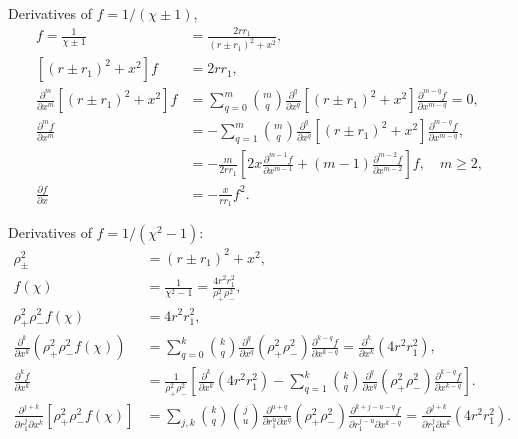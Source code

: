 \documentclass[a4paper,12pt]{article}
\begin{document}
Derivatives of $f=1/(\chi\pm1)$,
\begin{align*}
  f = \frac{1}{\chi\pm1} &= \frac{2rr_{1}}{(r\pm r_{1})^{2} + x^{2}},\\
  \left[
    (r\pm r_{1})^{2} + x^{2}
  \right]f
  &=
  2rr_{1},\\
  \frac{\partial^{m}}{\partial x^{m}}
  \left[
    (r\pm r_{1})^{2} + x^{2}
  \right]f &=
  \sum_{q=0}^{m}
  \binom{m}{q}
  \frac{\partial^{q}}{\partial x^{q}}
  \left[
    (r\pm r_{1})^{2} + x^{2}
  \right]
  \frac{\partial^{m-q}f}{\partial x^{m-q}}
  =
  0,\\
  \frac{\partial^{m}f}{\partial x^{m}}
  &=
  -
  \sum_{q=1}^{m}
  \binom{m}{q}
  \frac{\partial^{q}}{\partial x^{q}}
  \left[
    (r\pm r_{1})^{2} + x^{2}
  \right]
  \frac{\partial^{m-q}f}{\partial x^{m-q}},\\
  &= -\frac{m}{2rr_{1}}
  \left[
    2x
    \frac{\partial^{m-1}f}{\partial x^{m-1}}
    + (m-1)
    \frac{\partial^{m-2}f}{\partial x^{m-2}}
  \right]f,\quad m\geq 2,\\
  \frac{\partial f}{\partial x}
  &=
  -\frac{x}{rr_{1}}f^{2}. 
\end{align*}

Derivatives of $f=1/(\chi^{2}-1)$:
\begin{align*}
  \rho_{\pm}^{2} &= (r\pm r_{1})^{2} + x^{2},\\
  f(\chi)&= \frac{1}{\chi^{2}-1}
  = \frac{4r^{2}r_{1}^{2}}{\rho_{+}^{2}\rho_{-}^{2}},\\
  \rho_{+}^{2}\rho_{-}^{2}f(\chi)
  &=
  4r^{2}r_{1}^{2},\\
  \frac{\partial^{k}}{\partial x^{k}}
  \left(\rho_{+}^{2}\rho_{-}^{2}f(\chi)\right)
  &=
  \sum_{q=0}^{k}\binom{k}{q}
  \frac{\partial^{q}}{\partial x^{q}}
  \left(\rho_{+}^{2}\rho_{-}^{2}\right)
  \frac{\partial^{k-q}f}{\partial x^{k-q}}
  = 
  \frac{\partial^{k}}{\partial x^{k}}\left(4r^{2}r_{1}^{2}\right),\\  
  \frac{\partial^{k}f}{\partial x^{k}}
  &=
  \frac{1}{\rho_{+}^{2}\rho_{-}^{2}}
  \left[
    \frac{\partial^{k}}{\partial x^{k}}\left(4r^{2}r_{1}^{2}\right)
    -
    \sum_{q=1}^{k}\binom{k}{q}
    \frac{\partial^{q}}{\partial x^{q}}
    \left(\rho_{+}^{2}\rho_{-}^{2}\right)
    \frac{\partial^{k-q}f}{\partial x^{k-q}}
  \right].\\
  \frac{\partial^{j+k}}{\partial r_{1}^{j}\partial x^{k}}
  \left[\rho_{+}^{2}\rho_{-}^{2}f(\chi)\right]
  &=
  \sum_{j,k}
  \binom{k}{q}
  \binom{j}{u}
  \frac{\partial^{u+q}}{\partial r_{1}^{u}\partial x^{q}}  
  \left(\rho_{+}^{2}\rho_{-}^{2}\right)
  \frac{\partial^{k+j-u-q} f}{\partial r_{1}^{j-u}\partial x^{k-q}}
  = 
  \frac{\partial^{j+k}}{\partial r_{1}^{j}\partial x^{k}}
  \left(4r^{2}r_{1}^{2}\right).
\end{align*}
\end{document}
